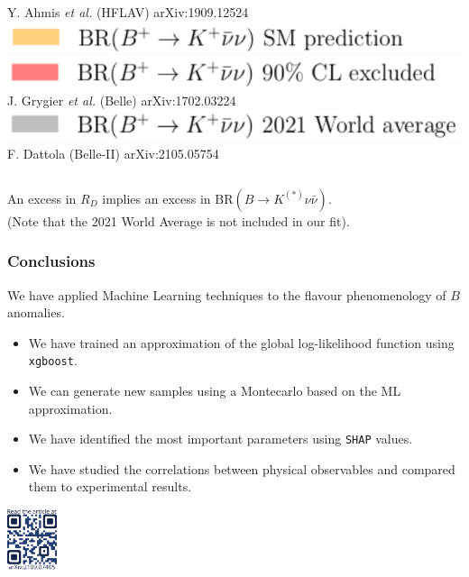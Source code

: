 \documentclass[mathserif, 10pt, dvipsnames]{beamer}
\newcommand\colorcite[1]{{\scriptsize\color{blue}#1}}
\begin{document}
\begin{frame}
\begin{center}
\begin{columns}[onlytextwidth]
\begin{column}{0.45\textwidth}
                \colorcite{Y. Ahmis \textit{et al.} (HFLAV) arXiv:1909.12524}\\[4pt]
                \includegraphics[width=\textwidth]{figures/RD_BKnunu_leg4.pdf}\\[2pt]
                \includegraphics[width=\textwidth]{figures/RD_BKnunu_leg5.pdf}\\[-6pt]
                \colorcite{J. Grygier \textit{et al.} (Belle) arXiv:1702.03224}\\[4pt]
                \includegraphics[width=\textwidth]{figures/RD_BKnunu_leg6.pdf}\\[-6pt]
                \colorcite{F. Dattola (Belle-II) arXiv:2105.05754}
            \end{column}
        \end{columns}

    \end{center}

    An excess in $R_D$ implies an excess in $\mathrm{BR}(B\to K^{(*)}\nu\bar{\nu})$. \\(Note that the {\color{gray}2021 World Average} is not included in our fit).

\end{frame}

\begin{frame}\frametitle{Conclusions}
    We have applied Machine Learning techniques to the flavour phenomenology of $B$ anomalies.
    \begin{itemize}
        \item We have trained an approximation of the global log-likelihood function using \texttt{xgboost}.
        \item We can generate new samples using a Montecarlo based on the ML approximation.
        \item We have identified the most important parameters using \texttt{SHAP} values.
        \item We have studied the correlations between physical observables and compared them to experimental results.
    \end{itemize}

    \vspace{0.5cm}
    \begin{center}
        \includegraphics[height=1.8cm]{qr_arxiv.png}
    \end{center}
\end{frame}
\end{document}
